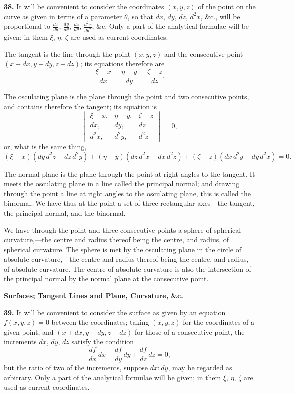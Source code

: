 \documentclass[11pt,a4paper]{article}
\begin{document}
\smallskip

\textbf{38.}\quad
It will be convenient to consider the coordinates $(x, y, z)$ of the point on the curve as given in terms of a parameter $\theta$, so that $dx$, $dy$, $dz$, $d^{2}x$, \&c., will be proportional to $\frac{dx}{d\theta}$, $\frac{dy}{d\theta}$, $\frac{dz}{d\theta}$, $\frac{d^{2}x}{d\theta^{2}}$, \&c. Only a part of the analytical formulae will be given; in them $\xi$, $\eta$, $\zeta$ are used as current coordinates.

The tangent is the line through the point $(x, y, z)$ and the consecutive point $(x + dx, y + dy, z + dz)$; its equations therefore are
\[
\frac{\xi - x}{dx} = \frac{\eta - y}{dy} = \frac{\zeta - z}{dz}.
\]

The osculating plane is the plane through the point and two consecutive points, and contains therefore the tangent; its equation is
\[
\begin{vmatrix}
\xi - x, & \eta - y, & \zeta - z \\
dx, & dy, & dz \\
d^{2}x, & d^{2}y, & d^{2}z
\end{vmatrix} = 0,
\]
or, what is the same thing,
\[
(\xi - x)(dy\, d^{2}z - dz\, d^{2}y) + (\eta - y)(dz\, d^{2}x - dx\, d^{2}z) + (\zeta - z)(dx\, d^{2}y - dy\, d^{2}x) = 0.
\]

The normal plane is the plane through the point at right angles to the tangent. It meets the osculating plane in a line called the principal normal; and drawing through the point a line at right angles to the osculating plane, this is called the binormal. We have thus at the point a set of three rectangular axes---the tangent, the principal normal, and the binormal.

We have through the point and three consecutive points a sphere of spherical curvature,---the centre and radius thereof being the centre, and radius, of spherical curvature. The sphere is met by the osculating plane in the circle of absolute curvature,---the centre and radius thereof being the centre, and radius, of absolute curvature. The centre of absolute curvature is also the intersection of the principal normal by the normal plane at the consecutive point.

\bigskip
\noindent\textbf{Surfaces; Tangent Lines and Plane, Curvature, \&c.}

\smallskip

\textbf{39.}\quad
It will be convenient to consider the surface as given by an equation $f(x, y, z) = 0$ between the coordinates; taking $(x, y, z)$ for the coordinates of a given point, and $(x + dx, y + dy, z + dz)$ for those of a consecutive point, the increments $dx$, $dy$, $dz$ satisfy the condition
\[
\frac{df}{dx}\, dx + \frac{df}{dy}\, dy + \frac{df}{dz}\, dz = 0,
\]
but the ratio of two of the increments, suppose $dx : dy$, may be regarded as arbitrary. Only a part of the analytical formulae will be given; in them $\xi$, $\eta$, $\zeta$ are used as current coordinates.
\end{document}
